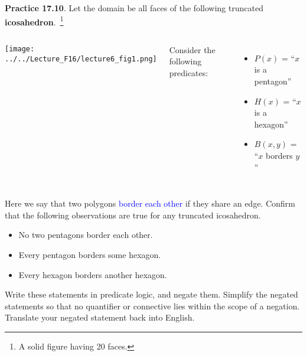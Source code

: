 \documentclass[aspectratio=169]{beamer}
\providecommand{\Blue}[1]{\textcolor{blue}{#1}}
\begin{document}
 \begin{frame}[plain]{}
 
 {\bf Practice 17.10}. 
  Let the domain be all faces of the following truncated {\bf icosahedron}.~\footnote{ 
    A solid figure having 20 faces. }
  \begin{columns}[c]
      \begin{center}
     \texttt{[image: ../../Lecture\_F16/lecture6\_fig1.png]}
  \end{center}
    Consider the following predicates:
  {\small
  \begin{itemize}
   \item $P(x)$ = ``$x$ is a pentagon''
   \item $H(x)$ = ``$x$ is a hexagon''
   \item $B(x, y)$ = ``$x$ borders $y$''
  \end{itemize}
  }
  \end{columns}
  Here we say that two polygons \Blue{border each other} if they share an edge.
    Confirm that the following observations are true for any truncated icosahedron.
   \begin{itemize}
    \item No two pentagons border each other.
    \item Every pentagon borders some hexagon.
    \item Every hexagon borders another hexagon.
   \end{itemize}
   Write these statements in predicate logic, and negate them. 
   Simplify the negated statements so that no quantifier or connective lies within
   the scope of a negation. Translate your negated statement back into English.  
  
 \end{frame}
\end{document}
